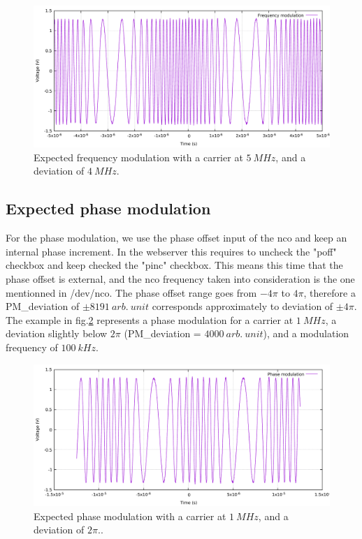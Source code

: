 \documentclass[12pt,oneside]{article}
\begin{document}
\begin{figure}[!h!tb]
	\begin{center}
		\includegraphics[width=14cm]{scope/Mod_freqOk.pdf}
		\caption{Expected frequency modulation with a carrier at $5~MHz$, and a deviation of $4~MHz$.}
		\label{fig:FMModOK}
	\end{center}
\end{figure}

\subsection{Expected phase modulation}

For the phase modulation, we use the phase offset input of the nco and keep an internal phase increment. In the webserver this requires to uncheck the "poff" checkbox and keep checked the "pinc" checkbox. This means this time that the phase offset is external, and the nco frequency taken into consideration is the one mentionned in /dev/nco. The phase offset range goes from $-4\pi$ to $4\pi$, therefore a PM\_deviation of $\pm 8191~arb.~unit$ corresponds approximately to deviation of $\pm 4 \pi$. 
\newline\newline
The example in fig.\ref{fig:PMModOK} represents a phase modulation for a carrier at $1~MHz$, a deviation slightly below $2\pi$ (PM\_deviation = $4000~arb.~unit$), and a modulation frequency of $100~kHz$.

\begin{figure}[!h!tb]
	\begin{center}
		\includegraphics[width=14cm]{scope/Mod_phaseOk.pdf}
		\caption{Expected phase modulation with a carrier at $1~MHz$, and a deviation of $2 \pi$..}
		\label{fig:PMModOK}
	\end{center}
\end{figure}
\end{document}
